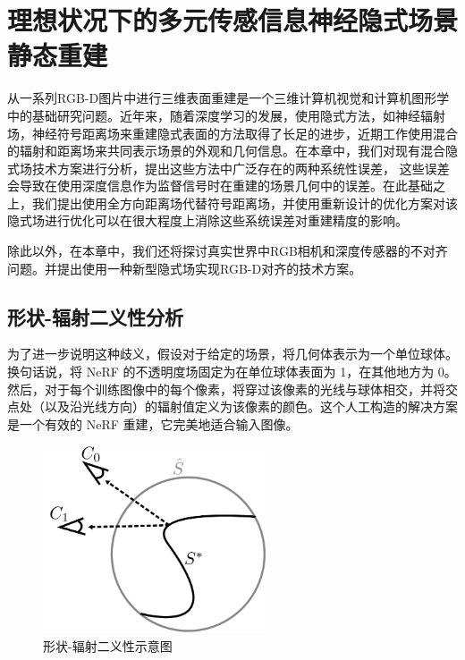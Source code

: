 \chapter{理想状况下的多元传感信息神经隐式场景静态重建}
\label{chapter: omninerf}
从一系列RGB-D图片中进行三维表面重建是一个三维计算机视觉和计算机图形学中的基础研究问题。近年来，随着深度学习的发展，使用隐式方法，如神经辐射场\cite{mildenhall_nerf_2020}，神经符号距离场\cite{wang_neus_2021}来重建隐式表面的方法取得了长足的进步，近期工作\cite{wang_neus_2021, azinovic_neural_2022}使用混合的辐射和距离场来共同表示场景的外观和几何信息。在本章中，我们对现有混合隐式场技术方案进行分析，提出这些方法中广泛存在的两种系统性误差， 这些误差会导致在使用深度信息作为监督信号时在重建的场景几何中的误差。在此基础之上，我们提出使用全方向距离场\cite{houchens_neuralodf_2022}代替符号距离场，并使用重新设计的优化方案对该隐式场进行优化可以在很大程度上消除这些系统误差对重建精度的影响。

除此以外，在本章中，我们还将探讨真实世界中RGB相机和深度传感器的不对齐问题。并提出使用一种新型隐式场实现RGB-D对齐的技术方案。


\section{形状-辐射二义性分析}

为了进一步说明这种歧义，假设对于给定的场景，将几何体表示为一个单位球体。换句话说，将 NeRF 的不透明度场固定为在单位球体表面为 1，在其他地方为 0。然后，对于每个训练图像中的每个像素，将穿过该像素的光线与球体相交，并将交点处（以及沿光线方向）的辐射值定义为该像素的颜色。这个人工构造的解决方案是一个有效的 NeRF 重建，它完美地适合输入图像。

\begin{figure}[ht]
    \centering
    \includegraphics[width=0.6\textwidth]{undergraduate-thesis/images/omni-nerf/shape-radiance ambiguity.png}
    \caption{形状-辐射二义性示意图\cite{zhang_nerf_2020}}
    \label{fig:omni-nerf shape-radiance ambiguity}
\end{figure}

